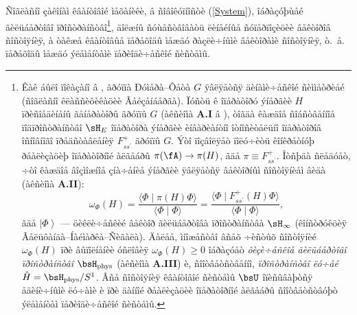 Ñîãëàñíî çàêîíàì êâàíòîâîé ìåõàíèêè, â ñîâîêóïíîñòè (\ref{System}), îáðàçóþùåé ãèëüáåðòîâî ïðîñòðàíñòâî\footnote{Êàê áûëî ïîêàçàíî â \cite{Var18}, ãðóïïà Ðóìåðà--Ôåòà $G$ ÿâëÿåòñÿ äèíàìè÷åñêîé ñèììåòðèåé (ñîãëàñíî êëàññèôèêàöèè Ãåéçåíáåðãà). Ïóñòü ê îïåðàòîðó ýíåðãèè $H$ ïðèñîåäèíåíû ãåíåðàòîðû ãðóïïû $G$ (àêñèîìà \textbf{A.I} â \cite{Var18}), òîãäà êàæäîå ñîáñòâåííîå ïîäïðîñòðàíñòâî $\sH_E$ îïåðàòîðà ýíåðãèè èíâàðèàíòíî îòíîñèòåëüíî îïåðàòîðîâ îñíîâíîãî ïðåäñòàâëåíèÿ $F^+_{ss^\prime}$ ãðóïïû $G$. Ýòî ïîçâîëÿåò ïîëó÷èòü êîíêðåòíóþ ðåàëèçàöèþ îïåðàòîðíîé àëãåáðû $\pi(\fA)\rightarrow\pi(H)$, ãäå $\pi\equiv F^+_{ss^\prime}$. Îòñþäà ñëåäóåò, ÷òî êàæäîå âîçìîæíîå çíà÷åíèå ýíåðãèè ÿâëÿåòñÿ âåêòîðíûì ñîñòîÿíèåì âèäà (àêñèîìà \textbf{A.II}):
\[
\omega_\Phi(H)=\frac{\langle\Phi\mid\pi(H)\Phi\rangle}{\langle\Phi\mid\Phi\rangle}=
\frac{\langle\Phi\mid F^+_{ss^\prime}(H)\Phi\rangle}{\langle\Phi\mid\Phi\rangle},
\]
ãäå $\left|\Phi\right\rangle$ --- öèêëè÷åñêèé âåêòîð ãèëüáåðòîâà ïðîñòðàíñòâà $\sH_\infty$ (êîíñòðóêöèÿ Ãåëüôàíäà--Íàéìàðêà--Ñèãàëà). Äàëåå, ìíîæåñòâî âñåõ ÷èñòûõ ñîñòîÿíèé $\omega_\Phi(H)$ ïðè âûïîëíåíèè óñëîâèÿ $\omega_\Phi(H)\geq 0$ îáðàçóåò \textit{ôèçè÷åñêîå ãèëüáåðòîâî ïðîñòðàíñòâî} $\bsH_{\rm phys}$ (àêñèîìà \textbf{A.III}) è, ñîîòâåòñòâåííî, \textit{ïðîñòðàíñòâî ëó÷åé} $\hat{H}=\bsH_{\rm phys}/S^1$. Âñå ñîñòîÿíèÿ êâàíòîâîé ñèñòåìû $\bsU$ îïèñûâàþòñÿ åäèíè÷íûìè ëó÷àìè è ïðè äàííîé ðåàëèçàöèè îïåðàòîðíîé àëãåáðû ñîîòâåòñòâóþò ýëåìåíòàì ïåðèîäè÷åñêîé ñèñòåìû.}, äîëæíû ñóùåñòâîâàòü ëèíåéíûå ñóïåðïîçèöèè âåêòîðîâ ñîñòîÿíèÿ, à òàêæå êâàíòîâûå ïåðåõîäû ìåæäó ðàçëè÷íûìè âåêòîðàìè ñîñòîÿíèÿ, ò.~å. ïåðåõîäû ìåæäó ýëåìåíòàìè ïåðèîäè÷åñêîé ñèñòåìû.

